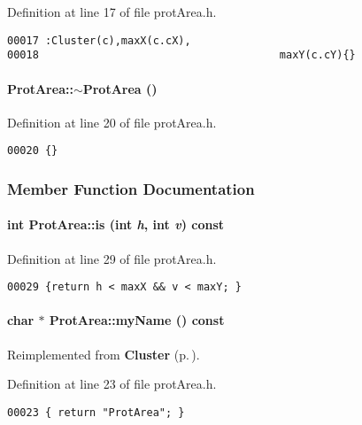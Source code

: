 Definition at line 17 of file prot\-Area.h.\small\begin{verbatim}00017 :Cluster(c),maxX(c.cX),
00018                                      maxY(c.cY){}
\end{verbatim}\normalsize 
\label{ProtArea_a1}
\paragraph{\setlength{\rightskip}{0pt plus 5cm}Prot\-Area::$\sim$Prot\-Area ()\hspace{0.3cm}{\tt  [inline]}}\hfill



Definition at line 20 of file prot\-Area.h.\small\begin{verbatim}00020 {}
\end{verbatim}\normalsize 


\subsubsection{Member Function Documentation}
\label{ProtArea_a5}
\paragraph{\setlength{\rightskip}{0pt plus 5cm}int Prot\-Area::is (int {\em h}, int {\em v}) const\hspace{0.3cm}{\tt  [inline]}}\hfill



Definition at line 29 of file prot\-Area.h.\small\begin{verbatim}00029 {return h < maxX && v < maxY; }
\end{verbatim}\normalsize 
\label{ProtArea_a3}
\paragraph{\setlength{\rightskip}{0pt plus 5cm}char $\ast$ Prot\-Area::my\-Name () const\hspace{0.3cm}{\tt  [inline, virtual]}}\hfill



Reimplemented from {\bf Cluster} {\rm (p.\,\pageref{Cluster_a4})}.

Definition at line 23 of file prot\-Area.h.\small\begin{verbatim}00023 { return "ProtArea"; }
\end{verbatim}\normalsize 
\label{ProtArea_a2}
